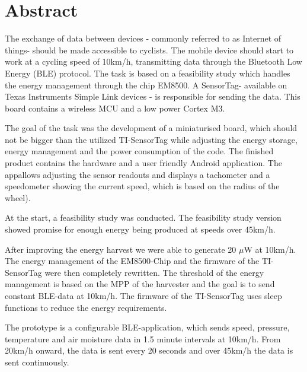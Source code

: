 \chapter*{Abstract}

The exchange of data between devices - commonly referred to as
\glqq Internet of things\grqq - should be made accessible to cyclists. The
mobile device should start to work at a cycling speed of 10km/h,
transmitting data through the Bluetooth Low Energy (BLE) protocol. The
task is based on a feasibility study which handles the energy
management through the chip EM8500. A \glqq SensorTag\grqq - available on Texas
Instruments Simple Link devices - is responsible for sending the data.
This board contains a wireless MCU and a low power Cortex M3.

The goal of the task was the development of a miniaturised board, which
should not be bigger than the utilized TI-SensorTag while adjusting the
energy storage, energy management and the power consumption of the
code. The finished product contains the hardware and a user friendly
Android application. The \glqq app\grqq allows adjusting the sensor readouts and
displays a tachometer and a speedometer showing the current speed, which is based on the radius of the wheel).

At the start, a feasibility study was conducted. The feasibility study
version showed promise for enough energy being produced at speeds
over 45km/h.

After improving the energy harvest we were able to generate 20
$\mu$W at 10km/h. The energy management of the EM8500-Chip and the
firmware of the TI-SensorTag were then completely rewritten. The
threshold of the energy management is based on the MPP of the harvester
and the goal is to send constant BLE-data at 10km/h. The firmware of
the TI-SensorTag uses sleep functions to reduce the energy
requirements.

The prototype is a configurable BLE-application, which sends speed,
pressure, temperature and air moisture data in 1.5 minute intervals at
10km/h. From 20km/h onward, the data is sent every 20 seconds and over
45km/h the data is sent continuously.
